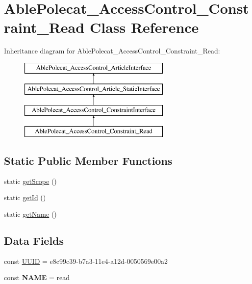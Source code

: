 \hypertarget{class_able_polecat___access_control___constraint___read}{}\section{Able\+Polecat\+\_\+\+Access\+Control\+\_\+\+Constraint\+\_\+\+Read Class Reference}
\label{class_able_polecat___access_control___constraint___read}
Inheritance diagram for Able\+Polecat\+\_\+\+Access\+Control\+\_\+\+Constraint\+\_\+\+Read\+:\begin{figure}[H]
\begin{center}
\leavevmode
\includegraphics[height=4.000000cm]{class_able_polecat___access_control___constraint___read}
\end{center}
\end{figure}
\subsection*{Static Public Member Functions}
\begin{DoxyCompactItemize}
\item 
static \hyperlink{class_able_polecat___access_control___constraint___read_ad9ade868bd136d32967059d1cccb3e92}{get\+Scope} ()
\item 
static \hyperlink{class_able_polecat___access_control___constraint___read_acfaa3a96d0cb5a4c0d4d710dcba41e9e}{get\+Id} ()
\item 
static \hyperlink{class_able_polecat___access_control___constraint___read_a4ef9bd37ba3ce8a13c1e8bcf4f72a630}{get\+Name} ()
\end{DoxyCompactItemize}
\subsection*{Data Fields}
\begin{DoxyCompactItemize}
\item 
const \hyperlink{class_able_polecat___access_control___constraint___read_a74b892c8c0b86bf9d04c5819898c51e7}{U\+U\+I\+D} = \textquotesingle{}e8c99c39-\/b7a3-\/11e4-\/a12d-\/0050569e00a2\textquotesingle{}
\item 
\hypertarget{class_able_polecat___access_control___constraint___read_a244352f035b82b20b0efa506167fd862}{}const {\bfseries N\+A\+M\+E} = \textquotesingle{}read\textquotesingle{}\label{class_able_polecat___access_control___constraint___read_a244352f035b82b20b0efa506167fd862}

\end{DoxyCompactItemize}


